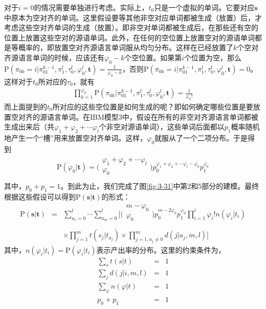\parinterval 对于$i=0$的情况需要单独进行考虑。实际上，$t_0$只是一个虚拟的单词。它要对应$\mathbf{s}$中原本为空对齐的单词。这里假设要等其他非空对应单词都被生成（放置）后，才考虑这些空对齐单词的生成（放置）。即非空对单词都被生成后，在那些还有空的位置上放置这些空对的源语单词。此外，在任何的空位置上放置空对的源语单词都是等概率的，即放置空对齐源语言单词服从均匀分布。这样在已经放置了$k$个空对齐源语言单词的时候，应该还有$\varphi_0-k$个空位置。如果第$i$个位置为空，那么$\textrm{P}(\pi_{0k}=i|\pi_{01}^{k-1},\pi_1^l,\tau_0^l,\varphi_0^l,\mathbf{t})=\frac{1}{\varphi_0-k}$，否则$\textrm{P}(\pi_{0k}=i|\pi_{01}^{k-1},\pi_1^l,\tau_0^l,\varphi_0^l,\mathbf{t})=0$。这样对于$t_0$所对应的$\tau_0$，就有
{
\begin{eqnarray}
\prod_{k=1}^{\varphi_0}{\textrm{P}(\pi_{0k}|\pi_{01}^{k-1},\pi_{1}^{l},\tau_{0}^{l},\varphi_{0}^{l},\mathbf{t})         }=\frac{1}{\varphi_{0}!}
\label{eq:3-50}
\end{eqnarray}
}
\parinterval 而上面提到的$t_0$所对应的这些空位置是如何生成的呢？即如何确定哪些位置是要放置空对齐的源语言单词。在IBM模型3中，假设在所有的非空对齐源语言单词都被生成出来后（共$\varphi_1+\varphi_2+\cdots {\varphi}_l$个非空对源语单词），这些单词后面都以$p_1$概率随机地产生一个``槽''用来放置空对齐单词。这样，${\varphi}_0$就服从了一个二项分布。于是得到
{
\begin{eqnarray}
\textrm{P}(\varphi_0|\mathbf{t})=\big(\begin{array}{c}
\varphi_1+\varphi_2+\cdots \varphi_l\\
\varphi_0\\
\end{array}\big)p_0^{\varphi_1+\varphi_2+\cdots \varphi_l-\varphi_0}p_1^{\varphi_0}
\label{eq:3-51}
\end{eqnarray}
}
\noindent 其中，$p_0+p_1=1$。到此为止，我们完成了图\ref{fig:3-31}中第2和5部分的建模。最终根据这些假设可以得到$\textrm{P}(\mathbf{s}| \mathbf{t})$的形式：
{
\begin{eqnarray}
{\textrm{P}(\mathbf{s}| \mathbf{t})}&= &{\sum_{a_1=0}^{l}{\cdots}\sum_{a_m=0}^{l}{\Big[\big(\begin{array}{c}
m-\varphi_0\\
\varphi_0\\
\end{array}\big)}p_0^{m-2\varphi_0}p_1^{\varphi_0}\prod_{i=1}^{l}{{\varphi_i}!n(\varphi_i|t_i)    }} \nonumber \\
& & \times{\prod_{j=1}^{m}{t(s_j|t_{a_j})} \times \prod_{j=1,a_j\neq 0}^{m}{d(j|a_j,m,l)}} \Big]
\label{eq:3-52}
\end{eqnarray}
}
\noindent 其中，$n(\varphi_i |t_i)={\textrm{P}(\varphi_i|t_i)}$表示产出率的分布。这里的约束条件为，
{
\begin{eqnarray}
\sum_{s}t(s|t)                     & = &1 \label{eq:3-53} \\
\sum_{j}d(j|i,m,l)                & = & 1 \label{eq:3-54} \\
\sum_{\varphi} n(\varphi|t) & = &1 \label{eq:3-55} \\
p_0+p_1                            & = & 1 \label{eq:3-56}
\end{eqnarray}
}

